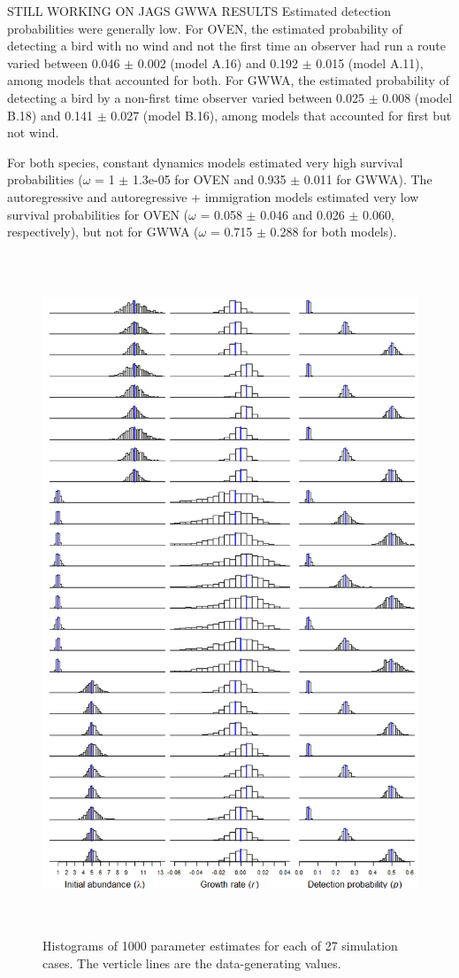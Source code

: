 \documentclass[12pt]{article}
\begin{document}
STILL WORKING ON JAGS GWWA RESULTS
Estimated detection probabilities were generally low.  For OVEN, the
estimated probability of detecting a bird with no wind and not the
first time an observer had run a route varied between 0.046 $\pm$ 0.002
(model A.16) and 0.192 $\pm$ 0.015 (model A.11), among models that
accounted for both.  For GWWA, the estimated probability of detecting
a bird by a non-first time observer varied between 0.025 $\pm$ 0.008
(model B.18) and 0.141 $\pm$ 0.027 (model B.16), among models that
accounted for first but not wind.

For both species, constant dynamics models estimated very high
survival probabilities ($\omega$ = 1 $\pm$ 1.3e-05 for OVEN and 0.935 $\pm$ 0.011 for
GWWA).   The autoregressive and autoregressive + immigration models
estimated very low survival probabilities for OVEN ($\omega$ = 0.058 $\pm$ 0.046
and 0.026 $\pm$ 0.060, respectively), but not for GWWA ($\omega$ = 0.715 $\pm$ 0.288
for both models).



\begin{figure}
  \centering
  \includegraphics[height=8in]{figs/exp_hists}
  \caption{Histograms of 1000 parameter estimates for each of 27 simulation cases. The verticle lines are the data-generating values.}
\label{fig:exp_hists}
\end{figure}
\end{document}

